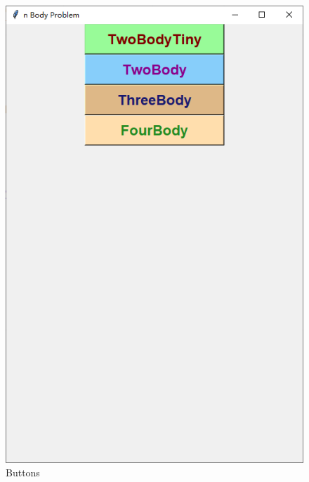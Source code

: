 \documentclass[]{report}
\begin{document}
		\begin{figure}[h]
			\centering
			\begin{minipage}{18em}
				\centering
				\includegraphics[scale=0.5]{pics/Buttons.PNG}
				\caption{Buttons}
			\end{minipage}
			\quad
			\begin{minipage}{18em}
				\centering

\end{minipage}
\end{figure}
\end{document}
